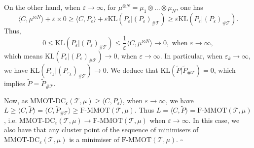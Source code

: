 \documentclass{article}
\newcommand{\qed}{\hfill $\square$}
\begin{document}
On the other hand, when $\varepsilon \to \infty$, for $\mu^{\otimes N} = \mu_1 \otimes ... \otimes \mu_N$, one has
\begin{equation*}
  \langle C, \mu^{\otimes N} \rangle + \varepsilon \times 0 \geq \langle C, P_{\varepsilon} \rangle + 
  \varepsilon \text{KL}(P_{\varepsilon} \vert (P_{\varepsilon})_{\# \mathcal T})
  \geq \varepsilon \text{KL}(P_{\varepsilon} \vert (P_{\varepsilon})_{\# \mathcal T}).
\end{equation*}
Thus,
\begin{equation*}
  0 \leq \text{KL}(P_{\varepsilon} \vert (P_{\varepsilon})_{\# \mathcal T}) \leq 
  \frac{1}{\varepsilon} \langle C, \mu^{\otimes N} \rangle \to 0, \text{ when } \varepsilon \to \infty,
\end{equation*}
which means $\text{KL}(P_{\varepsilon} \vert (P_{\varepsilon})_{\# \mathcal T}) \to 0$, when $\varepsilon \to \infty$. In particular, 
when $\varepsilon_k \to \infty$, we have $\text{KL}(P_{\varepsilon_k} \vert (P_{\varepsilon_k})_{\# \mathcal T}) \to 0$. We deduce that 
$\text{KL}(\widetilde{P} \vert \widetilde{P}_{\# \mathcal T}) = 0$, which implies $\widetilde{P} = \widetilde{P}_{\# \mathcal T}$.

Now, as $\text{MMOT-DC}_{\varepsilon}(\mathcal T, \mu) \geq \langle C, P_{\varepsilon} \rangle$, 
when $\varepsilon \to \infty$, we have $L \geq \langle C, \widetilde{P} \rangle = 
\langle C, \widetilde{P}_{\# \mathcal T} \rangle \geq \text{F-MMOT}(\mathcal T, \mu)$. 
Thus $L = \langle C, \widetilde{P} \rangle = \text{F-MMOT}(\mathcal T, \mu)$, i.e.
$\text{MMOT-DC}_{\varepsilon}(\mathcal T, \mu) \to \text{F-MMOT}(\mathcal T, \mu)$ when $\varepsilon \to \infty$. In this case, 
we also have that any cluster point of the sequence of minimisers of $\text{MMOT-DC}_{\varepsilon}(\mathcal T, \mu)$ 
is a minimiser of $\text{F-MMOT}(\mathcal T, \mu)$. \qed

\end{document}
